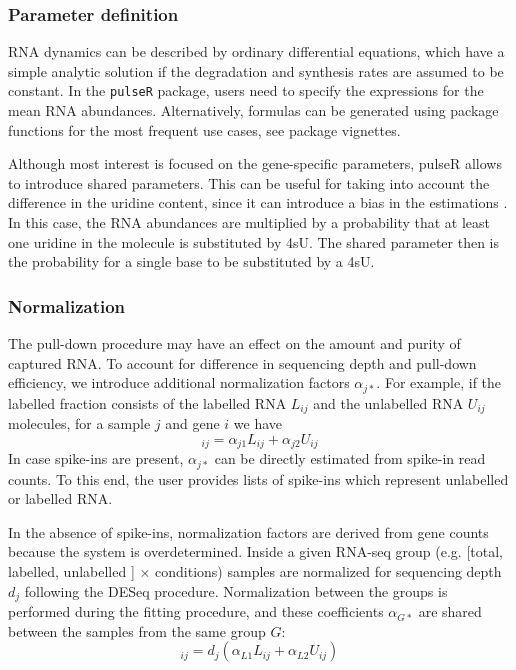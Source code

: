 \subsubsection*{Parameter definition}
RNA dynamics can be described by ordinary differential equations,
which have a simple analytic solution 
if the degradation and synthesis rates are assumed to be constant.
In the \verb|pulseR| package,
users need to specify the expressions for the mean RNA abundances.
Alternatively, formulas can be generated using package functions for the 
most frequent use cases, see package vignettes. 

Although most interest is focused on the gene-specific parameters,
pulseR allows to introduce shared parameters.
 This can be useful for taking into account the difference in the uridine content, since
it can introduce a bias in the estimations \citep{miller2011dynamic,
schwalb2012measurement}.
In this case, the RNA abundances are multiplied by 
a probability that at least one uridine in the molecule is substituted by 4sU.
The shared parameter then is the probability for a single base to be substituted
by a 4sU.
\subsubsection*{Normalization}
The pull-down procedure may have an effect on the amount and purity of captured RNA.
To account for difference in sequencing depth and pull-down efficiency,
we introduce additional normalization factors $\alpha_{j*}$. 
 For example, 
if the labelled fraction consists of the labelled RNA $L_{ij}$ and the unlabelled RNA
 $U_{ij}$ molecules, for a sample $j$ and gene $i$ we have 
\begin{equation}
 [\text{labelled fraction}]_{ij}  = \alpha_{j1} L_{ij} + \alpha_{j2} U_{ij}
\end{equation}
In case spike-ins are present, $\alpha_{j*}$  can be directly estimated from spike-in read counts. 
To this end, the user provides lists of spike-ins which represent unlabelled or labelled RNA.
\par
In the absence of spike-ins, 
normalization factors are derived from gene counts
because the system is overdetermined.
Inside a given RNA-seq group (e.g. [total, labelled, unlabelled ] $\times$ conditions) samples are normalized for sequencing depth $d_j$ following the DESeq procedure.
Normalization between the groups is performed during the fitting procedure, 
and these coefficients $\alpha_{G*}$  are shared between the samples from the same group $G$:
\begin{equation}
 [\text{labelled fraction}]_{ij}  = d_j(\alpha_{L1} L_{ij} + \alpha_{L2} U_{ij})
\end{equation}

